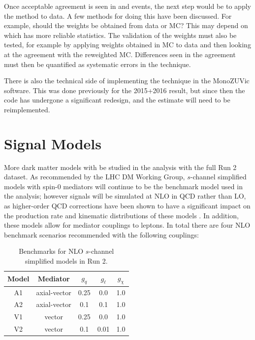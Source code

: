 Once acceptable agreement is seen in \gjets and \Zjets events, the next step would be to apply the method to data. A few methods for doing this have been discussed. For example, should the weights be obtained from data or MC? This may depend on which has more reliable statistics. The validation of the weights must also be tested, for example by applying weights obtained in MC to data and then looking at the agreement with the reweighted MC. Differences seen in the agreement must then be quantified as systematic errors in the technique. 

There is also the technical side of implementing the \gjets technique in the MonoZUVic software. This was done previously for the 2015+2016 result, but since then the code has undergone a significant redesign, and the \gjets estimate will need to be reimplemented.

\section{Signal Models}

More dark matter models with be studied in the \monoZ analysis with the full Run 2 dataset. As recommended by the LHC DM Working Group, $s$-channel simplified models with spin-0 mediators will continue to be the benchmark model used in the analysis; however signals will be simulated at NLO in QCD rather than LO, as higher-order QCD corrections have been shown to have a significant impact on the production rate and kinematic distributions of these models \cite{Backovic:2015soa}. In addition, these models allow for mediator couplings to leptons. In total there are four NLO benchmark scenarios recommended \cite{Albert:2017onk} with the following couplings:

\begin{table}[h]
\centering
\begin{tabular}{ccccc}
\hline \hline
Model & Mediator     & $g_q$ & $g_\ell$ & $g_\chi$ \\ \hline \hline
A1    & axial-vector & 0.25  & 0.0      & 1.0      \\ \hline
A2    & axial-vector & 0.1   & 0.1      & 1.0      \\ \hline
V1    & vector       & 0.25  & 0.0      & 1.0      \\ \hline
V2    & vector       & 0.1   & 0.01     & 1.0    \\ \hline \hline
\end{tabular}
\caption{Benchmarks for NLO $s$-channel simplified models in Run 2.}
\label{tbl:nloSimp}
\end{table}

